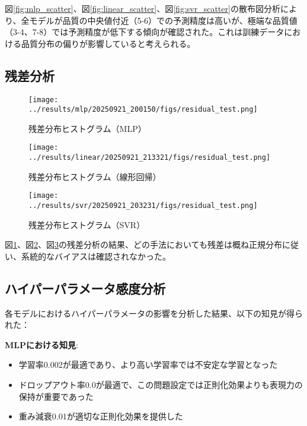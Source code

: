 \documentclass[12pt,a4paper,dvipdfmx]{jsarticle}
\begin{document}
図\ref{fig:mlp_scatter}、図\ref{fig:linear_scatter}、図\ref{fig:svr_scatter}の散布図分析により、全モデルが品質の中央値付近（5-6）での予測精度は高いが、極端な品質値（3-4、7-8）では予測精度が低下する傾向が確認された。これは訓練データにおける品質分布の偏りが影響していると考えられる。

\subsection{残差分析}

\begin{figure}[H]
\centering
\texttt{[image: ../results/mlp/20250921\_200150/figs/residual\_test.png]}
\caption{残差分布ヒストグラム（MLP）}
\label{fig:mlp_residual}
\end{figure}

\begin{figure}[H]
\centering
\texttt{[image: ../results/linear/20250921\_213321/figs/residual\_test.png]}
\caption{残差分布ヒストグラム（線形回帰）}
\label{fig:linear_residual}
\end{figure}

\begin{figure}[H]
\centering
\texttt{[image: ../results/svr/20250921\_203231/figs/residual\_test.png]}
\caption{残差分布ヒストグラム（SVR）}
\label{fig:svr_residual}
\end{figure}

図\ref{fig:mlp_residual}、図\ref{fig:linear_residual}、図\ref{fig:svr_residual}の残差分析の結果、どの手法においても残差は概ね正規分布に従い、系統的なバイアスは確認されなかった。

\subsection{ハイパーパラメータ感度分析}

各モデルにおけるハイパーパラメータの影響を分析した結果、以下の知見が得られた：

\textbf{MLPにおける知見}:
\begin{itemize}
    \item 学習率0.002が最適であり、より高い学習率では不安定な学習となった
    \item ドロップアウト率0.0が最適で、この問題設定では正則化効果よりも表現力の保持が重要であった
    \item 重み減衰0.01が適切な正則化効果を提供した
\end{itemize}
\end{document}
